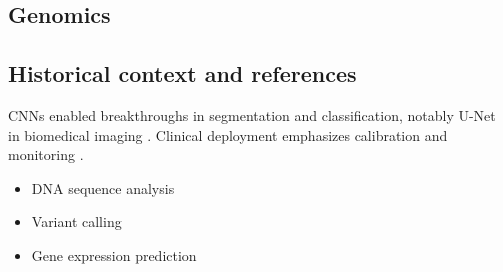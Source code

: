 \subsection{Genomics}



\subsection{Historical context and references}

CNNs enabled breakthroughs in segmentation and classification, notably U-Net in biomedical imaging \textcite{Ronneberger2015}. Clinical deployment emphasizes calibration and monitoring \textcite{Prince2023}.
\begin{itemize}
    \item DNA sequence analysis
    \item Variant calling
    \item Gene expression prediction
\end{itemize}

